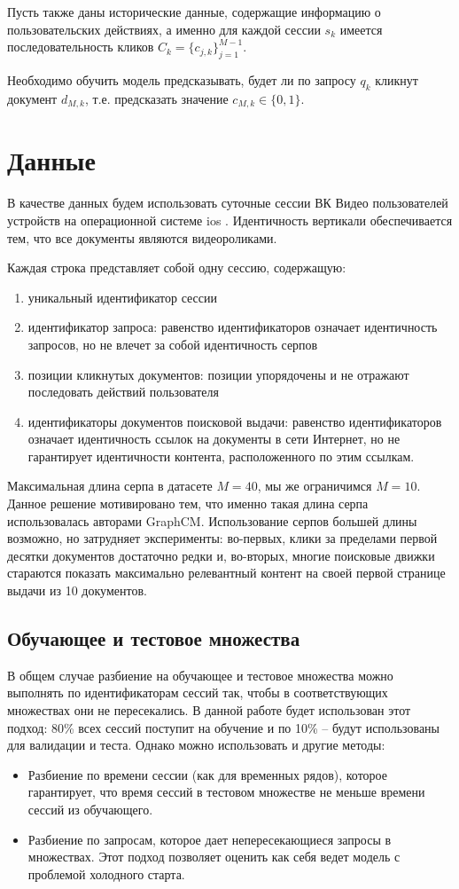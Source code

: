 \documentclass[diploma]{nanolab2015}
\begin{document}
Пусть также даны исторические данные, содержащие информацию о пользовательских действиях, а именно для каждой сессии $s_k$ имеется последовательность кликов $C_k = \{c_{j,k}\}_{j=1}^{M-1}$.

Необходимо обучить модель предсказывать, будет ли по запросу $q_k$ кликнут документ $d_{M, k}$, т.е. предсказать значение $c_{M, k} \in \{0, 1\}$.

\section{Данные}
В качестве данных будем использовать суточные сессии ВК Видео пользователей устройств на операционной системе ios \cite{vkds}. Идентичность вертикали обеспечивается тем, что все документы являются видеороликами.

Каждая строка представляет собой одну сессию, содержащую:

\begin{enumerate}
    \item уникальный идентификатор сессии
    \item идентификатор запроса: равенство идентификаторов означает идентичность запросов, но не влечет за собой идентичность серпов
    \item позиции кликнутых документов: позиции упорядочены и не отражают последовать действий пользователя
    \item идентификаторы документов поисковой выдачи: равенство идентификаторов означает идентичность ссылок на документы в сети Интернет, но не гарантирует идентичности контента, расположенного по этим ссылкам.
\end{enumerate}

Максимальная длина серпа в датасете $M = 40$, мы же ограничимся $M = 10$. Данное решение мотивировано тем, что именно такая длина серпа использовалась авторами GraphCM. Использование серпов большей длины возможно, но затрудняет эксперименты: во-первых, клики за пределами первой десятки документов достаточно редки и, во-вторых, многие поисковые движки стараются показать максимально релевантный контент на своей первой странице выдачи из 10 документов.

\subsection{Обучающее и тестовое множества}
В общем случае разбиение на обучающее и тестовое множества можно выполнять по идентификаторам сессий так, чтобы в соответствующих множествах они не пересекались. В данной работе будет использован этот подход: 80\% всех сессий поступит на обучение и по 10\% -- будут использованы для валидации и теста. Однако можно использовать и другие методы:
\begin{itemize}
    \item Разбиение по времени сессии (как для временных рядов), которое гарантирует, что время сессий в тестовом множестве не меньше времени сессий из обучающего.
    \item Разбиение по запросам, которое дает непересекающиеся запросы в множествах. Этот подход позволяет оценить как себя ведет модель с проблемой холодного старта.
\end{itemize}
\end{document}
